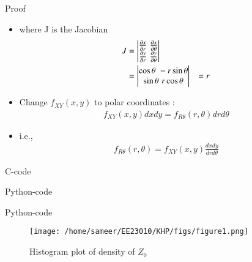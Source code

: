 \documentclass{beamer}
\begin{document}
\begin{frame}{Proof}
  \begin{itemize} 
  \item where J is the Jacobian 
  \begin{align}
  	J &= \begin{vmatrix}\frac{\partial x}{\partial r} \,\, \frac{\partial x}{\partial \theta}\\\frac{\partial y}{\partial r} \,\, \frac{\partial y}{\partial \theta}\end{vmatrix}\\
  	&= \begin{vmatrix}\cos\theta \,\, -r\sin\theta \\ \sin\theta \,\, r\cos\theta\end{vmatrix}
  	&= r
  \end{align}
  \item Change $f_{XY}(x,y)$ to polar coordinates :
  \begin{align}
  	f_{XY}(x,y) dxdy = f_{R\theta}(r,\theta) drd\theta
  \end{align}
  \item i.e.,
  \begin{align}
  	f_{R\theta}(r,\theta) = f_{XY}(x,y) \frac{dxdy}{drd\theta}
  \end{align}
  \end{itemize}
\end{frame}

\begin{frame}[allowframebreaks]{C-code}
  
\end{frame}

\begin{frame}{Python-code}
  
\end{frame}

\begin{frame}{Python-code}
\begin{figure}
  \centering
  \texttt{[image: /home/sameer/EE23010/KHP/figs/figure1.png]}  %
  \caption{Histogram plot of density of $Z_0$}
  \label{fig:your_label}
\end{figure}
\end{frame}
\end{document}
